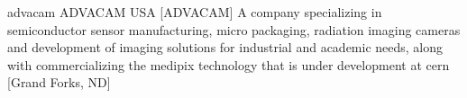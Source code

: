 \newglsXcompany%
{advacam}%
{ADVACAM USA}%
[ADVACAM]%
{A company specializing in semiconductor sensor manufacturing, micro packaging, radiation imaging cameras and development of imaging solutions for industrial and academic needs, along with commercializing the \gls{medipix} technology that is under development at \gls{cern} \cite{website:Advacam}}%
[Grand Forks, ND]%